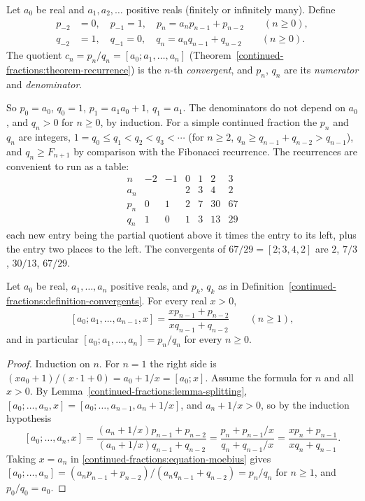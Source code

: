 \begin{definition}\label{continued-fractions:definition-convergents}
Let $a_0$ be real and $a_1, a_2, \ldots$ positive reals (finitely or infinitely many). Define
\[
\begin{aligned}
p_{-2} &= 0, \quad p_{-1} = 1, \quad p_n = a_np_{n-1} + p_{n-2} \qquad (n \geq 0),\\
q_{-2} &= 1, \quad q_{-1} = 0, \quad q_n = a_nq_{n-1} + q_{n-2} \qquad (n \geq 0).
\end{aligned}
\]
The quotient $c_n = p_n/q_n = [a_0; a_1, \ldots, a_n]$ (Theorem~\ref{continued-fractions:theorem-recurrence}) is the $n$-th \emph{convergent}, and $p_n$, $q_n$ are its \emph{numerator} and
\emph{denominator}.
\end{definition}

So $p_0 = a_0$, $q_0 = 1$, $p_1 = a_1a_0 + 1$, $q_1 = a_1$. The denominators do not depend on $a_0$, and $q_n > 0$ for $n \geq 0$, by induction. For a simple continued fraction the $p_n$ and $q_n$
are integers, $1 = q_0 \leq q_1 < q_2 < q_3 < \cdots$ (for $n \geq 2$, $q_n \geq q_{n-1} + q_{n-2} > q_{n-1}$), and $q_n \geq F_{n+1}$ by comparison with the Fibonacci recurrence. The
recurrences are convenient to run as a table:
\[
\begin{array}{c|cccccc}
n & -2 & -1 & 0 & 1 & 2 & 3\\ \hline
a_n & & & 2 & 3 & 4 & 2\\
p_n & 0 & 1 & 2 & 7 & 30 & 67\\
q_n & 1 & 0 & 1 & 3 & 13 & 29
\end{array}
\]
each new entry being the partial quotient above it times the entry to its left, plus the entry two places to the left. The convergents of $67/29 = [2; 3, 4, 2]$ are $2$, $7/3$, $30/13$, $67/29$.

\begin{theorem}\label{continued-fractions:theorem-recurrence}
Let $a_0$ be real, $a_1, \ldots, a_n$ positive reals, and $p_k$, $q_k$ as in Definition~\ref{continued-fractions:definition-convergents}. For every real $x > 0$,
\begin{equation}\label{continued-fractions:equation-moebius}
[a_0; a_1, \ldots, a_{n-1}, x] = \frac{xp_{n-1} + p_{n-2}}{xq_{n-1} + q_{n-2}} \qquad (n \geq 1),
\end{equation}
and in particular $[a_0; a_1, \ldots, a_n] = p_n/q_n$ for every $n \geq 0$.
\end{theorem}

\begin{proof}
Induction on $n$. For $n = 1$ the right side is $(xa_0 + 1)/(x \cdot 1 + 0) = a_0 + 1/x = [a_0; x]$. Assume the formula for $n$ and all $x > 0$. By
Lemma~\ref{continued-fractions:lemma-splitting}, $[a_0; \ldots, a_n, x] = [a_0; \ldots, a_{n-1}, a_n + 1/x]$, and $a_n + 1/x > 0$, so by the induction hypothesis
\[
[a_0; \ldots, a_n, x] = \frac{(a_n + 1/x)p_{n-1} + p_{n-2}}{(a_n + 1/x)q_{n-1} + q_{n-2}} = \frac{p_n + p_{n-1}/x}{q_n + q_{n-1}/x} = \frac{xp_n + p_{n-1}}{xq_n + q_{n-1}}.
\]
Taking $x = a_n$ in \eqref{continued-fractions:equation-moebius} gives $[a_0; \ldots, a_n] = (a_np_{n-1} + p_{n-2})/(a_nq_{n-1} + q_{n-2}) = p_n/q_n$ for $n \geq 1$, and $p_0/q_0 = a_0$.
\end{proof}

